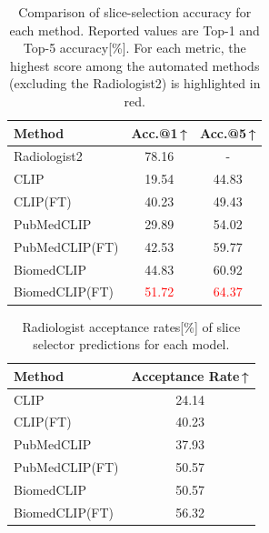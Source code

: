 \documentclass[bioengineering,article,submit,pdftex,moreauthors]{Definitions/mdpi}
\begin{document}
\begin{table}[ht]
  \centering
  \caption{Comparison of slice-selection accuracy for each method. 
  Reported values are Top-1 and Top-5 accuracy[\%]. 
  For each metric, the highest score among the automated methods (excluding the Radiologist2) is highlighted in red.}
  \label{tab:slice_extraction_accuracy}
  \begin{tabular}{lcc}
    \toprule
    Method                  & Acc.@1\,↑      & Acc.@5\,↑      \\
    \midrule
    Radiologist2            & 78.16       & -           \\
    CLIP                    & 19.54       & 44.83       \\
    CLIP(FT)                & 40.23       & 49.43       \\
    PubMedCLIP              & 29.89       & 54.02       \\
    PubMedCLIP(FT)          & 42.53       & 59.77       \\
    BiomedCLIP              & 44.83       & 60.92       \\
    BiomedCLIP(FT)          & \textcolor{red}{51.72} & \textcolor{red}{64.37} \\
    \bottomrule
  \end{tabular}
\end{table}


\begin{table}[ht]
  \centering
  \caption{Radiologist acceptance rates[\%] of slice selector predictions for each model.}
  \label{tab:slice_selector_adoption}
  \begin{tabular}{lc}
    \toprule
    Method                  & Acceptance Rate\,↑ \\
    \midrule
    CLIP                    & 24.14        \\
    CLIP(FT)                & 40.23        \\
    PubMedCLIP              & 37.93        \\
    PubMedCLIP(FT)          & 50.57        \\
    BiomedCLIP              & 50.57        \\
    BiomedCLIP(FT)          & 56.32        \\
    \bottomrule
  \end{tabular}
\end{table}
\end{document}

